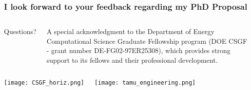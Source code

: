 \documentclass[compress,10pt]{beamer}
\newlength \figwidth
\begin{document}


\typeout{***********************************************************************************}

\begin{frame}[plain]
   \frametitle{I look forward to your feedback regarding my PhD Proposal}

\vspace{38mm}

\begin{columns}[b]




\centering

{\Large Questions?}

\vspace{9mm}
\footnotesize
A special acknowledgment to the Department of Energy Computational Science Graduate Fellowship program (DOE CSGF - grant number DE-FG02-97ER25308), which provides strong support to its fellows and their professional development.

\end{columns}

\vspace{10mm}

\begin{columns}[b]

\setlength {}

{}\texttt{[image: CSGF\_horiz.png]}\\



{}\texttt{[image: tamu\_engineering.png]}\\

\end{columns}

\end{frame}
\end{document}
